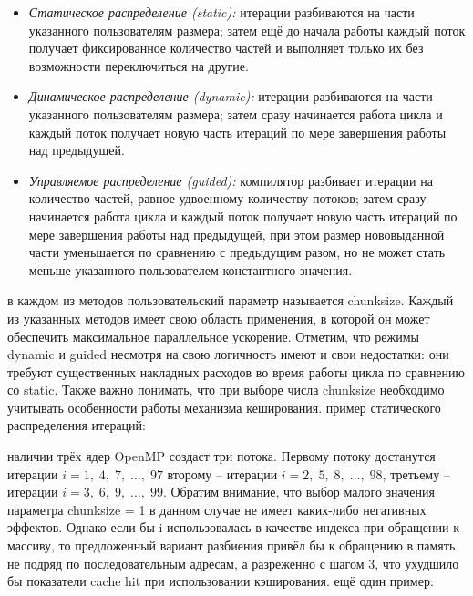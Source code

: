 {\begin{itemize}
		\item\textit{Статическое распределение (static):} итерации разбиваются на части указанного пользователям размера; затем ещё до начала работы каждый поток получает фиксированное количество частей и выполняет только их без возможности переключиться на другие.
		\item\textit{Динамическое распределение (dynamic):} итерации разбиваются на части указанного пользователям размера; затем сразу начинается работа цикла и каждый поток получает новую часть итераций по мере завершения работы над предыдущей.
		\item\textit{Управляемое распределение (guided):} компилятор разбивает итерации на количество частей, равное удвоенному количеству потоков; затем сразу начинается работа цикла и каждый поток получает новую часть итераций по мере завершения работы над предыдущей, при этом размер нововыданной части уменьшается по сравнению с предыдущим разом, но не может стать меньше указанного пользователем константного значения.
	\end{itemize}
	 в каждом из методов пользовательский параметр называется chunk\textunderscore size. Каждый из указанных методов имеет свою область применения, в которой он может обеспечить максимальное параллельное ускорение. Отметим, что режимы dynamic и guided несмотря на свою логичность имеют и свои недостатки: они требуют существенных накладных расходов во время работы цикла по сравнению со static. Также важно понимать, что при выборе числа chunk\textunderscore size необходимо учитывать особенности работы механизма кеширования.
	 пример статического распределения итераций:
	\begin{figure}[H]
		
	\end{figure}
	 наличии трёх ядер OpenMP создаст три потока. Первому потоку достанутся итерации $i=1,\;4,\;7,\;…,\;97$ второму – итерации $i=2,\;5,\;8,\;…,\;98$, третьему – итерации $i=3,\;6,\;9,\;…,\;99$. Обратим внимание, что выбор малого значения параметра chunk\textunderscore size = 1 в данном случае не имеет каких-либо негативных эффектов. Однако если бы i использовалась в качестве индекса при обращении к массиву, то предложенный вариант разбиения привёл бы к обращению в память не подряд по последовательным адресам, а разреженно с шагом 3, что ухудшило бы показатели cache hit при использовании кэширования.
	 ещё один пример: 
	\begin{figure}[H]
		
	\end{figure}
}
